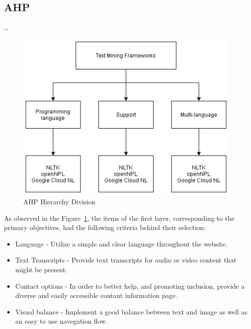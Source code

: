 \subsection{AHP}

\dots

\begin{figure}[H]
\centering
\includegraphics[width=\textwidth,keepaspectratio]{ch2/assets/AHP.png}
\caption[AHP Hierarchy Division]{AHP Hierarchy Division}
\label{fig:AHP}
\end{figure}

As observed in the Figure~\ref{fig:AHP}, the items of the first layer, corresponding to the primary objectives, had the following criteria behind their selection:

\begin{itemize}
    \item Language - Utilize a simple and clear language throughout the website.
    \item Text Transcripts - Provide text transcripts for audio or video content that might be present.
    \item Contact options - In order to better help, and promoting inclusion, provide a diverse and easily accessible contant information page.
    \item Visual balance - Implement a good balance between text and image as well as an easy to use navegation flow.
\end{itemize}



